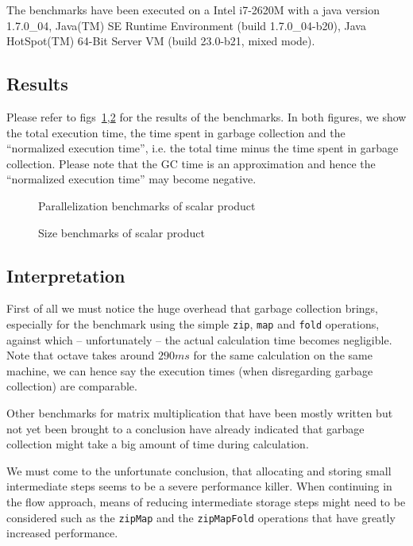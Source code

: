 \documentclass[runningheads,a4paper,fleqn]{llncs}
\begin{document}
The benchmarks have been executed on a Intel i7-2620M with a java
version 1.7.0\_04, Java(TM) SE Runtime Environment (build
1.7.0\_04-b20), Java HotSpot(TM) 64-Bit Server VM (build 23.0-b21,
mixed mode).

\subsection{Results}

Please refer to figs~\ref{fig:par-bench},\ref{fig:size-bench} for the
results of the benchmarks. In both figures, we show the total
execution time, the time spent in garbage collection and the
``normalized execution time'', i.e. the total time minus the time
spent in garbage collection. Please note that the GC time is an
approximation and hence the ``normalized execution time'' may become
negative.

\begin{figure}
\caption{Parallelization benchmarks of scalar product}
\label{fig:par-bench}
\end{figure}

\begin{figure}
\caption{Size benchmarks of scalar product}
\label{fig:size-bench}
\end{figure}

\subsection{Interpretation}
First of all we must notice the huge overhead that garbage collection
brings, especially for the benchmark using the simple \texttt{zip},
\texttt{map} and \texttt{fold} operations, against which --
unfortunately -- the actual calculation time becomes negligible. Note
that octave \cite{eaton1997gnu} takes around $290 ms$ for the same
calculation on the same machine, we can hence say the execution times
(when disregarding garbage collection) are comparable.

Other benchmarks for matrix multiplication that have been mostly
written but not yet been brought to a conclusion have already
indicated that garbage collection might take a big amount of time
during calculation.

We must come to the unfortunate conclusion, that allocating and
storing small intermediate steps seems to be a severe performance
killer. When continuing in the flow approach, means of reducing
intermediate storage steps might need to be considered such as the
\texttt{zipMap} and the \texttt{zipMapFold} operations that have
greatly increased performance.
\end{document}

